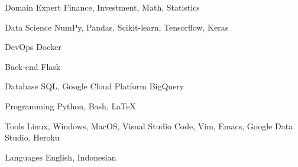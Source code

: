 

\begin{cvskills}

  \cvskill
    {Domain Expert} %
    {Finance, Investment, Math, Statistics} %

  \cvskill
    {Data Science} %
    {NumPy, Pandas, Scikit-learn, Tensorflow, Keras} %

  \cvskill
    {DevOps} %
    {Docker} %

  \cvskill
    {Back-end} %
    {Flask} %

  \cvskill
    {Database} %
    {SQL, Google Cloud Platform BigQuery} %

  \cvskill
    {Programming} %
    {Python, Bash, LaTeX} %

  \cvskill
    {Tools} %
    {Linux, Windows, MacOS, Visual Studio Code, Vim, Emacs, Google Data Studio, Heroku} %

  \cvskill
    {Languages} %
    {English, Indonesian} %

\end{cvskills}
